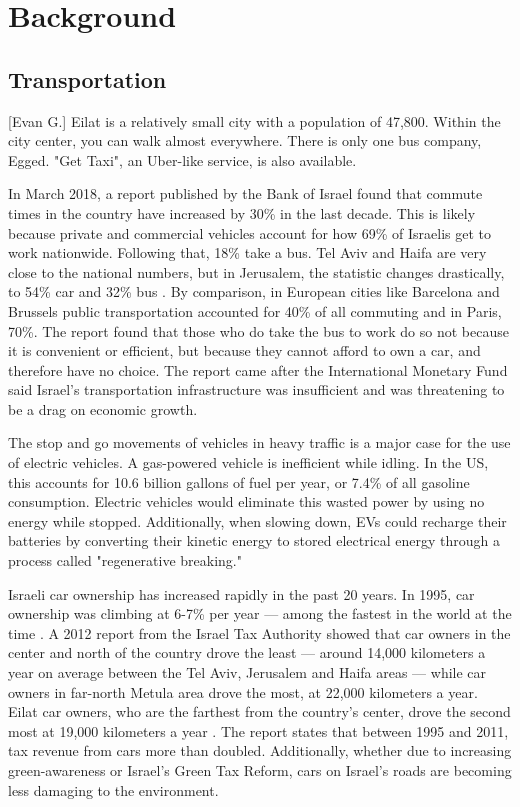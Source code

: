 \documentclass{article}                         %
\begin{document}
\newpage
\section{Background}

\subsection{Transportation}[Evan G.]
Eilat is a relatively small city with a population of 47,800. Within the city center, you can walk almost everywhere. There is only one bus company, Egged. \cite{TransportationEilat} "Get Taxi", an Uber-like service, is also available. 

In March 2018, a report published by the Bank of Israel found that commute times in the country have increased by 30\% in the last decade. This is likely because private and commercial vehicles account for how 69\% of Israelis get to work nationwide. Following that, 18\% take a bus. Tel Aviv and Haifa are very close to the national numbers, but in Jerusalem, the statistic changes drastically, to 54\% car and 32\% bus \cite{Dori2018IsraeliRoads}. By comparison, in European cities like Barcelona and Brussels public transportation accounted for 40\% of all commuting and in Paris, 70\%. The report found that those who do take the bus to work do so not because it is convenient or efficient, but because they cannot afford to own a car, and therefore have no choice. The report came after the International Monetary Fund said Israel’s transportation infrastructure was insufficient and was threatening to be a drag on economic growth. 

The stop and go movements of vehicles in heavy traffic is a major case for the use of electric vehicles. A gas-powered vehicle is inefficient while idling. In the US, this accounts for 10.6 billion gallons of fuel per year, or 7.4\% of all gasoline consumption. Electric vehicles would eliminate this wasted power by using no energy while stopped. Additionally, when slowing down, EVs could recharge their batteries by converting their kinetic energy to stored electrical energy through a process called "regenerative breaking."

Israeli car ownership has increased rapidly in the past 20 years. In 1995, car ownership was climbing at 6-7\% per year --- among the fastest in the world at the time \cite{Slater1995IsraelCulture}. A 2012 report from the Israel Tax Authority showed that car owners in the center and north of the country drove the least --- around 14,000 kilometers a year on average between the Tel Aviv, Jerusalem and Haifa areas --- while car owners in far-north Metula area drove the most, at 22,000 kilometers a year. Eilat car owners, who are the farthest from the country’s center, drove the second most at 19,000 kilometers a year \cite{Schmil2012WhatHow}. The report states that between 1995 and 2011, tax revenue from cars more than doubled. Additionally, whether due to increasing green-awareness or Israel’s Green Tax Reform, cars on Israel's roads are becoming less damaging to the environment\cite{Schmil2012WhatHow}.
\end{document}
